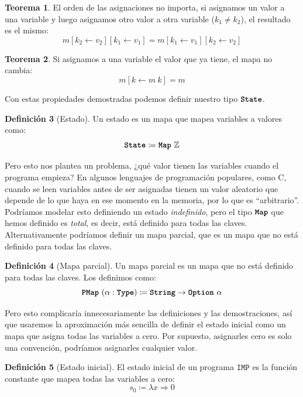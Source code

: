 \documentclass[
  a4paper, 
  10pt, 
  parskip=half, 
  toc=bibliography,
]{scrbook}
\theoremstyle{definition}
\theoremstyle{bolddef}
\newtheorem{theorem}{Teorema}[section]
\newtheorem{definition}[theorem]{Definición}
\newcommand{\tyfont}[1]{\texttt{\textbf{#1}}}
\renewcommand{\mapsto}{\Rightarrow}
\newcommand{\ImpName}{\texttt{IMP}}
\begin{document}
\begin{theorem}
  El orden de las asignaciones no importa, si asignamos un valor a una
  variable y luego asignamos otro valor a otra variable (\(k_1 \neq k_2\)), el
  resultado es el mismo:
  \[
  m[k_2 \leftarrow v_2][k_1 \leftarrow v_1] = m[k_1 \leftarrow v_1][k_2 \leftarrow v_2]
  \]
\end{theorem}

\begin{theorem}
  Si asignamos a una variable el valor que ya tiene, el mapa no cambia:
  \[
  m[k \leftarrow m \ k] = m
  \]
\end{theorem}

Con estas propiedades demostradas podemos definir nuestro tipo \(\tyfont{State}\).
\begin{definition}[Estado]
  Un estado es un mapa que mapea variables a valores como:
  \[
  \tyfont{State} \coloneqq \tyfont{Map} \ \mathbb{Z}
  \]
\end{definition}

Pero esto nos plantea un problema, ¿qué valor tienen las variables cuando el
programa empieza? En algunos lenguajes de programación populares, como C,
cuando se leen variables antes de ser asignadas tienen un valor aleatorio que
depende de lo que haya en ese momento en la memoria, por lo que es \enquote{arbitrario}.
Podríamos modelar esto definiendo un estado \emph{indefinido}, pero el tipo
\(\tyfont{Map}\) que hemos definido es \emph{total}, es decir, está definido
para todas las claves. Alternativamente podríamos definir un mapa parcial, que es un mapa que
no está definido para todas las claves.
\begin{definition}[Mapa parcial]
  Un mapa parcial es un mapa que no está definido para todas las claves. Los
  definimos como:
  \[
  \tyfont{PMap} \ (\alpha : \tyfont{Type}) \coloneqq \tyfont{String} \to \tyfont{Option} \ \alpha
  \]
\end{definition}

Pero esto complicaría innecesariamente las definiciones y las demostraciones, así que
usaremos la aproximación más sencilla de definir el estado inicial como un
mapa que asigna todas las variables a cero. Por supuesto, asignarles cero es
solo una convención, podríamos asignarles cualquier valor.

\begin{definition}[Estado inicial]
  El estado inicial de un programa \(\ImpName\) es la función constante que
  mapea todas las variables a cero:
  \[
  s_0 \coloneqq \lambda x \mapsto 0
  \]
\end{definition}
\end{document}

